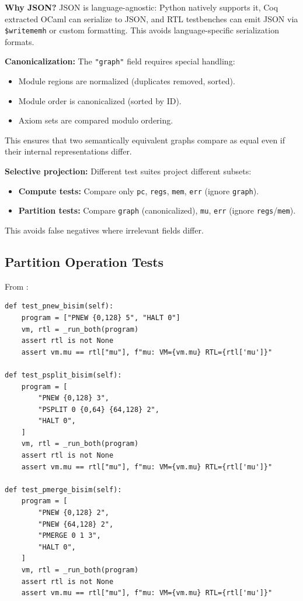 \textbf{Why JSON?} JSON is language-agnostic: Python natively supports it, Coq extracted OCaml can serialize to JSON, and RTL testbenches can emit JSON via \texttt{\$writememh} or custom formatting. This avoids language-specific serialization formats.

\textbf{Canonicalization:} The \texttt{"graph"} field requires special handling:
\begin{itemize}
    \item Module regions are normalized (duplicates removed, sorted).
    \item Module order is canonicalized (sorted by ID).
    \item Axiom sets are compared modulo ordering.
\end{itemize}
This ensures that two semantically equivalent graphs compare as equal even if their internal representations differ.

\textbf{Selective projection:} Different test suites project different subsets:
\begin{itemize}
    \item \textbf{Compute tests:} Compare only \texttt{pc}, \texttt{regs}, \texttt{mem}, \texttt{err} (ignore \texttt{graph}).
    \item \textbf{Partition tests:} Compare \texttt{graph} (canonicalized), \texttt{mu}, \texttt{err} (ignore \texttt{regs}/\texttt{mem}).
\end{itemize}
This avoids false negatives where irrelevant fields differ.

\subsection{Partition Operation Tests}

From :
\begin{lstlisting}
def test_pnew_bisim(self):
    program = ["PNEW {0,128} 5", "HALT 0"]
    vm, rtl = _run_both(program)
    assert rtl is not None
    assert vm.mu == rtl["mu"], f"mu: VM={vm.mu} RTL={rtl['mu']}"

def test_psplit_bisim(self):
    program = [
        "PNEW {0,128} 3",
        "PSPLIT 0 {0,64} {64,128} 2",
        "HALT 0",
    ]
    vm, rtl = _run_both(program)
    assert rtl is not None
    assert vm.mu == rtl["mu"], f"mu: VM={vm.mu} RTL={rtl['mu']}"

def test_pmerge_bisim(self):
    program = [
        "PNEW {0,128} 2",
        "PNEW {64,128} 2",
        "PMERGE 0 1 3",
        "HALT 0",
    ]
    vm, rtl = _run_both(program)
    assert rtl is not None
    assert vm.mu == rtl["mu"], f"mu: VM={vm.mu} RTL={rtl['mu']}"
\end{lstlisting}


